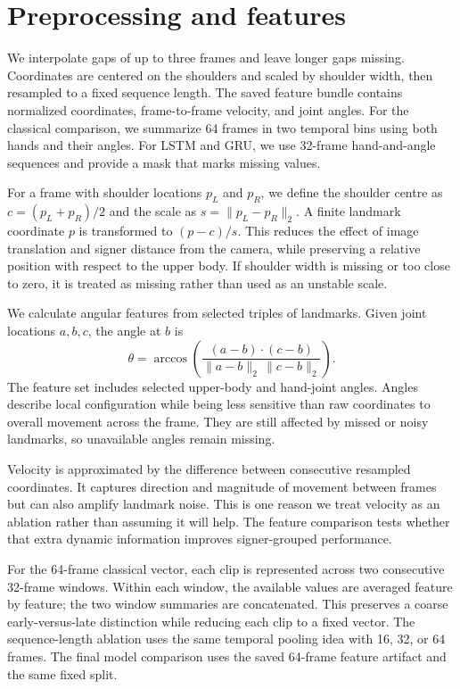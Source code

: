 \documentclass[12pt,a4paper,oneside]{report}
\begin{document}
\section{Preprocessing and features}
We interpolate gaps of up to three frames and leave longer gaps missing. Coordinates are centered on the shoulders and scaled by shoulder width, then resampled to a fixed sequence length. The saved feature bundle contains normalized coordinates, frame-to-frame velocity, and joint angles. For the classical comparison, we summarize 64 frames in two temporal bins using both hands and their angles. For LSTM and GRU, we use 32-frame hand-and-angle sequences and provide a mask that marks missing values.

For a frame with shoulder locations $p_L$ and $p_R$, we define the shoulder centre as $c=(p_L+p_R)/2$ and the scale as $s=\lVert p_L-p_R\rVert_2$. A finite landmark coordinate $p$ is transformed to $(p-c)/s$. This reduces the effect of image translation and signer distance from the camera, while preserving a relative position with respect to the upper body. If shoulder width is missing or too close to zero, it is treated as missing rather than used as an unstable scale.

We calculate angular features from selected triples of landmarks. Given joint locations $a,b,c$, the angle at $b$ is
\[
\theta = \arccos\left(\frac{(a-b)\cdot(c-b)}{\lVert a-b\rVert_2\,\lVert c-b\rVert_2}\right).
\]
The feature set includes selected upper-body and hand-joint angles. Angles describe local configuration while being less sensitive than raw coordinates to overall movement across the frame. They are still affected by missed or noisy landmarks, so unavailable angles remain missing.

Velocity is approximated by the difference between consecutive resampled coordinates. It captures direction and magnitude of movement between frames but can also amplify landmark noise. This is one reason we treat velocity as an ablation rather than assuming it will help. The feature comparison tests whether that extra dynamic information improves signer-grouped performance.

For the 64-frame classical vector, each clip is represented across two consecutive 32-frame windows. Within each window, the available values are averaged feature by feature; the two window summaries are concatenated. This preserves a coarse early-versus-late distinction while reducing each clip to a fixed vector. The sequence-length ablation uses the same temporal pooling idea with 16, 32, or 64 frames. The final model comparison uses the saved 64-frame feature artifact and the same fixed split.
\end{document}
